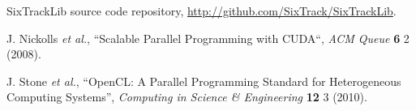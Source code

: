 \documentclass[a4paper,
              ]{jacow}
\begin{document}
\begin{thebibliography}{99}











SixTrackLib source code repository,
\url{http://github.com/SixTrack/SixTrackLib}.

J. Nickolls {\it et al.}, ``Scalable Parallel Programming with CUDA``, {\it ACM Queue} {\bf 6} 2 (2008).

J. Stone {\it et al.}, ``OpenCL: A Parallel Programming Standard for Heterogeneous Computing Systems'', {\it  Computing in Science \& Engineering} {\bf 12} 3 (2010).

\end{thebibliography}
\null 
\end{document}
